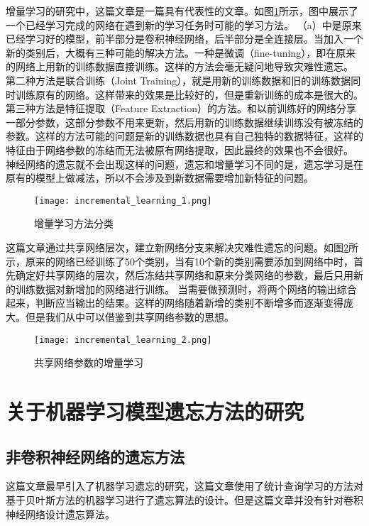 增量学习的研究中，这篇文章\cite{8107520}是一篇具有代表性的文章。如图\ref{fig:incremental_learning_1}所示，图中展示了一个已经学习完成的网络在遇到新的学习任务时可能的学习方法。
（a）中是原来已经学习好的模型，前半部分是卷积神经网络，后半部分是全连接层。当加入一个新的类别后，大概有三种可能的解决方法。一种是微调（fine-tuning），即在原来的网络上用新的训练数据直接训练。这样的方法会毫无疑问地导致灾难性遗忘。
第二种方法是联合训练（Joint Training），就是用新的训练数据和旧的训练数据同时训练原有的网络。这样带来的效果是比较好的，但是重新训练的成本是很大的。
第三种方法是特征提取（Feature Extraction）的方法。和以前训练好的网络分享一部分参数，这部分参数不用来更新，然后用新的训练数据继续训练没有被冻结的参数。这样的方法可能的问题是新的训练数据也具有自己独特的数据特征，这样的特征由于网络参数的冻结而无法被原有网络提取，因此最终的效果也不会很好。
神经网络的遗忘就不会出现这样的问题，遗忘和增量学习不同的是，遗忘学习是在原有的模型上做减法，所以不会涉及到新数据需要增加新特征的问题。
\begin{figure}
    \centering
    \texttt{[image: incremental\_learning\_1.png]}
    \caption{增量学习方法分类\cite{8107520}}
    \label{fig:incremental_learning_1}
\end{figure}

这篇文章\cite{Sarwar_2020}通过共享网络层次，建立新网络分支来解决灾难性遗忘的问题。如图\ref{fig:incremental_learning_2}所示，原来的网络已经训练了50个类别，当有10个新的类别需要添加到网络中时，首先确定好共享网络的层次，然后冻结共享网络和原来分类网络的参数，最后只用新的训练数据对新增加的网络进行训练。
当需要做预测时，将两个网络的输出综合起来，判断应当输出的结果。这样的网络随着新增的类别不断增多而逐渐变得庞大。但是我们从中可以借鉴到共享网络参数的思想。
\begin{figure}
    \centering
    \texttt{[image: incremental\_learning\_2.png]}
    \caption{共享网络参数的增量学习\cite{Sarwar_2020}}
    \label{fig:incremental_learning_2}
\end{figure}

\section{关于机器学习模型遗忘方法的研究}
\subsection{非卷积神经网络的遗忘方法}
这篇文章\cite{yinzhicao2015}最早引入了机器学习遗忘的研究，这篇文章使用了统计查询学习的方法对基于贝叶斯方法的机器学习进行了遗忘算法的设计。但是这篇文章并没有针对卷积神经网络设计遗忘算法。

